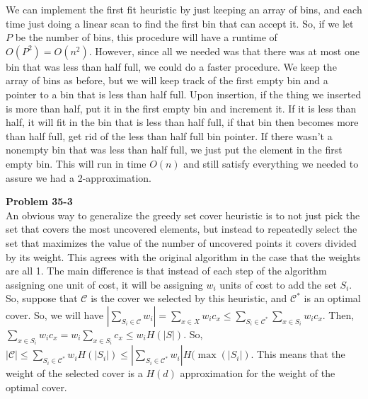 \documentclass{article}
\begin{document}
\begin{enumerate}[a.]
We can implement the first fit heuristic by just keeping an array of bins, and each time just doing a linear scan to find the first bin that can accept it. So, if we let $P$ be the number of bins, this procedure will have a runtime of $O(P^2) = O(n^2)$. However, since all we needed was that there was at most one bin that was less than half full, we could do a faster procedure. We keep the array of bins as before, but we will keep track of the first empty bin and a pointer to a bin that is less than half full. Upon insertion, if the thing we inserted is more than half, put it in the first empty bin and increment it. If it is less than half, it will fit in the bin that is less than half full, if that bin then becomes more than half full, get rid of the less than half full bin pointer. If there wasn't a nonempty bin that was less than half full, we just put the element in the first empty bin. This will run in time $O(n)$ and still satisfy everything we needed to assure we had a 2-approximation.
\end{enumerate}



\noindent\textbf{Problem 35-3}\\

An obvious way to generalize the greedy set cover heuristic is to not just pick the set that covers the most uncovered elements, but instead to repeatedly select the set that maximizes the value of the number of uncovered points it covers divided by its weight. This agrees with the original algorithm in the case that the weights are all 1. The main difference is that instead of each step of the algorithm assigning one unit of cost, it will be assigning $w_i$ units of cost to add the set $S_i$. So, suppose that $\mathcal{C}$ is the cover we selected by this heuristic, and $\mathcal{C}^*$ is an optimal cover. So, we will have $|\sum_{S_i\in \mathcal{C}} w_i| = \sum_{x\in X} w_ic_x \le \sum_{S_i \in \mathcal{C}^*} \sum_{x\in S_i} w_i c_x$. Then, $\sum_{x\in S_i} w_ic_x = w_i \sum_{x\in S_i} c_x \le w_i H(|S|) $. So, $|\mathcal{C}| \le \sum_{S_i\in \mathcal{C}^*}  w_i H(|S_i|) \le |\sum_{S_i\in \mathcal{C}^*} w_i| H(\max(|S_i|) $. This means that the weight of the selected cover is a $H(d)$ approximation for the weight of the optimal cover.
\end{document}
